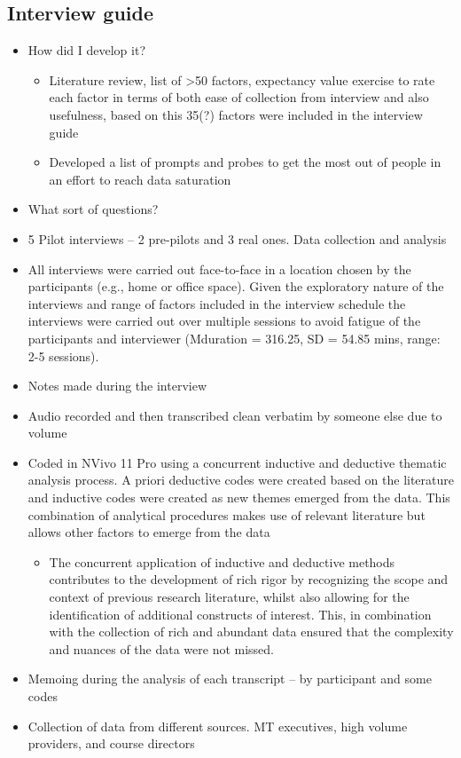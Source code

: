 \documentclass[a4paper,]{book}
\providecommand{\tightlist}{%
  \setlength{\itemsep}{0pt}\setlength{\parskip}{0pt}}
\begin{document}
\hypertarget{interview-guide}{%
\subsection{Interview guide}\label{interview-guide}}

\begin{itemize}
\tightlist
\item
  How did I develop it?

  \begin{itemize}
  \tightlist
  \item
    Literature review, list of \textgreater{}50 factors, expectancy value exercise to rate each factor in terms of both ease of collection from interview and also usefulness, based on this 35(?) factors were included in the interview guide
  \item
    Developed a list of prompts and probes to get the most out of people in an effort to reach data saturation
  \end{itemize}
\item
  What sort of questions?
\item
  5 Pilot interviews -- 2 pre-pilots and 3 real ones.
  Data collection and analysis
\item
  All interviews were carried out face-to-face in a location chosen by the participants (e.g., home or office space). Given the exploratory nature of the interviews and range of factors included in the interview schedule the interviews were carried out over multiple sessions to avoid fatigue of the participants and interviewer (Mduration = 316.25, SD = 54.85 mins, range: 2-5 sessions).
\item
  Notes made during the interview
\item
  Audio recorded and then transcribed clean verbatim by someone else due to volume
\item
  Coded in NVivo 11 Pro using a concurrent inductive and deductive thematic analysis process. A priori deductive codes were created based on the literature and inductive codes were created as new themes emerged from the data. This combination of analytical procedures makes use of relevant literature but allows other factors to emerge from the data

  \begin{itemize}
  \tightlist
  \item
    The concurrent application of inductive and deductive methods contributes to the development of rich rigor by recognizing the scope and context of previous research literature, whilst also allowing for the identification of additional constructs of interest. This, in combination with the collection of rich and abundant data ensured that the complexity and nuances of the data were not missed. \citep{Webster2017}
  \end{itemize}
\item
  Memoing during the analysis of each transcript -- by participant and some codes
\item
  Collection of data from different sources. MT executives, high volume providers, and course directors
\end{itemize}
\end{document}
